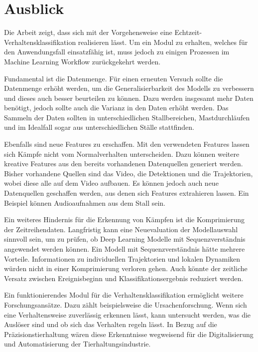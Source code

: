\section{Ausblick} \label{sec:Ausblick}

Die Arbeit zeigt, dass sich mit der Vorgehensweise eine Echtzeit-Verhaltensklassifikation realisieren lässt. Um ein Modul zu erhalten, welches für den Anwendungsfall einsatzfähig ist, muss jedoch zu einigen Prozessen im Machine Learning Workflow zurückgekehrt werden. \par

Fundamental ist die Datenmenge. Für einen erneuten Versuch sollte die Datenmenge erhöht werden, um die Generalisierbarkeit des Modells zu verbessern und dieses auch besser beurteilen zu können. Dazu werden insgesamt mehr Daten benötigt, jedoch sollte auch die Varianz in den Daten erhöht werden. Das Sammeln der Daten sollten in unterschiedlichen Stallbereichen, Mastdurchläufen und im Idealfall sogar aus unterschiedlichen Ställe stattfinden. \par

Ebenfalls sind neue Features zu erschaffen. Mit den verwendeten Features lassen sich Kämpfe nicht vom Normalverhalten unterscheiden. Dazu können weitere kreative Features aus den bereits vorhandenen Datenquellen generiert werden. Bisher vorhandene Quellen sind das Video, die Detektionen und die Trajektorien, wobei diese alle auf dem Video aufbauen. Es können jedoch auch neue Datenquellen geschaffen werden, aus denen sich Features extrahieren lassen. Ein Beispiel können Audioaufnahmen aus dem Stall sein. \par

Ein weiteres Hindernis für die Erkennung von Kämpfen ist die Komprimierung der Zeitreihendaten. Langfristig kann eine Neuevaluation der Modellauswahl sinnvoll sein, um zu prüfen, ob Deep Learning Modelle mit Sequenzverständnis angewendet werden können. Ein Modell mit Sequenzverständnis hätte mehrere Vorteile. Informationen zu individuellen Trajektorien und lokalen Dynamiken würden nicht in einer Komprimierung verloren gehen. Auch könnte der zeitliche Versatz zwischen Ereignisbeginn und Klassifikationsergebnis reduziert werden. \par

Ein funktionierendes Modul für die Verhaltensklassifikation ermöglicht weitere Forschungsansätze. Dazu zählt beispielsweise die Ursachenforschung. Wenn sich eine Verhaltensweise zuverlässig erkennen lässt, kann untersucht werden, was die Auslöser sind und ob sich das Verhalten regeln lässt. In Bezug auf die Präzisionstierhaltung wären diese Erkenntnisse wegweisend für die Digitalisierung und Automatisierung der Tierhaltungsindustrie.